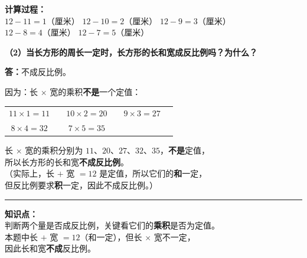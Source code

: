 \vspace{0.4cm}

{
\small\color{gray}
\textbf{计算过程：}\\
$12 - 11 = 1$（厘米）\quad
$12 - 10 = 2$（厘米）\quad
$12 - 9 = 3$（厘米）\\
$12 - 8 = 4$（厘米）\quad\;
$12 - 7 = 5$（厘米）
}

\vspace{1cm}

\noindent\textbf{（2）当长方形的周长一定时，长方形的长和宽成反比例吗？为什么？}

\vspace{0.4cm}

\noindent
\textbf{答：}不成反比例。

\vspace{0.3cm}

\noindent
因为：长 $\times$ 宽的乘积\textbf{不是}一个定值：

\vspace{0.2cm}

\begin{center}
\renewcommand{\arraystretch}{1.6}
\begin{tabular}{cccccc}
$11 \times 1 = 11$ & \quad &
$10 \times 2 = 20$ & \quad &
$9 \times 3 = 27$ \\[4pt]
$8 \times 4 = 32$ & \quad &
$7 \times 5 = 35$ & & \\
\end{tabular}
\end{center}

\vspace{0.3cm}

\noindent
长 $\times$ 宽的乘积分别为 $11$、$20$、$27$、$32$、$35$，\textbf{不是}定值，\\[4pt]
所以长方形的长和宽\textbf{\textcolor{red!70!black}{不成反比例}}。\\[8pt]
（实际上，长 $+$ 宽 $= 12$ 是定值，所以它们的\textbf{和}一定，\\[2pt]
\phantom{（}但反比例要求\textbf{积}一定，因此不成反比例。）

\vspace{1cm}
\hrule
\vspace{0.4cm}

{\small\color{gray}
\textbf{知识点：}\\
判断两个量是否成反比例，关键看它们的\textbf{乘积}是否为定值。\\
本题中长 $+$ 宽 $= 12$（和一定），但长 $\times$ 宽不一定，\\
因此长和宽\textbf{不成}反比例。
}


